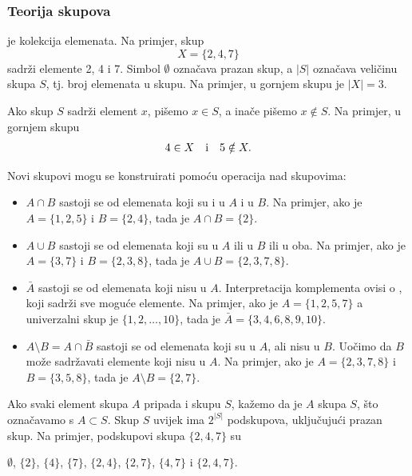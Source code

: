 \subsubsection{Teorija skupova}


 je kolekcija elemenata.
Na primjer, skup
\[X=\{2,4,7\}\]
sadrži elemente 2, 4 i 7.
Simbol $\emptyset$ označava prazan skup,
a $|S|$ označava veličinu skupa $S$,
tj. broj elemenata u skupu.
Na primjer, u gornjem skupu je $|X|=3$.

Ako skup $S$ sadrži element $x$,
pišemo $x \in S$,
a inače pišemo $x \notin S$.
Na primjer, u gornjem skupu
\[4 \in X \hspace{10px}\textrm{i}\hspace{10px} 5 \notin X.\]

\begin{samepage}
Novi skupovi mogu se konstruirati pomoću operacija nad skupovima:
\begin{itemize}
\item {} $A \cap B$ sastoji se od elemenata
koji su i u $A$ i u $B$.
Na primjer, ako je $A=\{1,2,5\}$ i $B=\{2,4\}$,
tada je $A \cap B = \{2\}$.
\item {} $A \cup B$ sastoji se od elemenata
koji su u $A$ ili u $B$ ili u oba.
Na primjer, ako je $A=\{3,7\}$ i $B=\{2,3,8\}$,
tada je $A \cup B = \{2,3,7,8\}$.
\item {} $\bar A$ sastoji se od elemenata
koji nisu u $A$.
Interpretacija komplementa ovisi o
, koji sadrži sve moguće elemente.
Na primjer, ako je $A=\{1,2,5,7\}$ a univerzalni skup je
$\{1,2,\ldots,10\}$, tada je $\bar A = \{3,4,6,8,9,10\}$.
\item {} $A \setminus B = A \cap \bar B$
sastoji se od elemenata koji su u $A$, ali nisu u $B$.
Uočimo da $B$ može sadržavati elemente koji nisu u $A$.
Na primjer, ako je $A=\{2,3,7,8\}$ i $B=\{3,5,8\}$,
tada je $A \setminus B = \{2,7\}$.
\end{itemize}
\end{samepage}

Ako svaki element skupa $A$ pripada i skupu $S$,
kažemo da je $A$  skupa $S$,
što označavamo s $A \subset S$.
Skup $S$ uvijek ima $2^{|S|}$ podskupova,
uključujući prazan skup.
Na primjer, podskupovi skupa $\{2,4,7\}$ su
\begin{center}
$\emptyset$,
$\{2\}$, $\{4\}$, $\{7\}$, $\{2,4\}$, $\{2,7\}$, $\{4,7\}$ i $\{2,4,7\}$.
\end{center}

